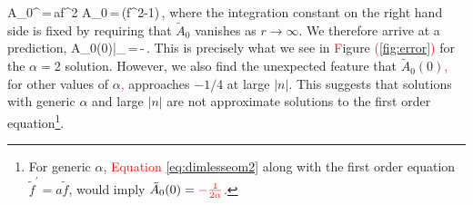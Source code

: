 \be
\tilde A_0^\prime\,=\,a\tilde f^2 \quad{}  \quad 
\tilde A_0\,=\,\left(\tilde f^2-1\right)\,,
\ee
where the integration constant on the right hand side is fixed by requiring that $\tilde A_0$ vanishes as $r\to\infty$. 
We therefore arrive at a prediction,
\be
\tilde A_0(0)\big|_{}\,=\,-\,.
\ee
This is precisely what we see in \textcolor{red}{F}igure \textcolor{red}{(}\ref{fig:error}\textcolor{red}{)} for the $\alpha=2$ solution. However, we also find the unexpected feature that $\tilde A_0(0)$\textcolor{red}{,} for other values of $\alpha$\textcolor{red}{,} approaches $-1/4$ at large $|n|$. This suggests  that solutions with generic $\alpha$ and large $|n|$ are not approximate  solutions to the first order equation\footnote{For generic $\alpha$, \textcolor{red}{Equation} \eqref{eq:dimlesseom2} along with the first order equation $\tilde f^\prime = a \tilde f$, would imply $\tilde A_0(0)=\textcolor{red}{-\frac{1}{2\alpha}}$. }.
